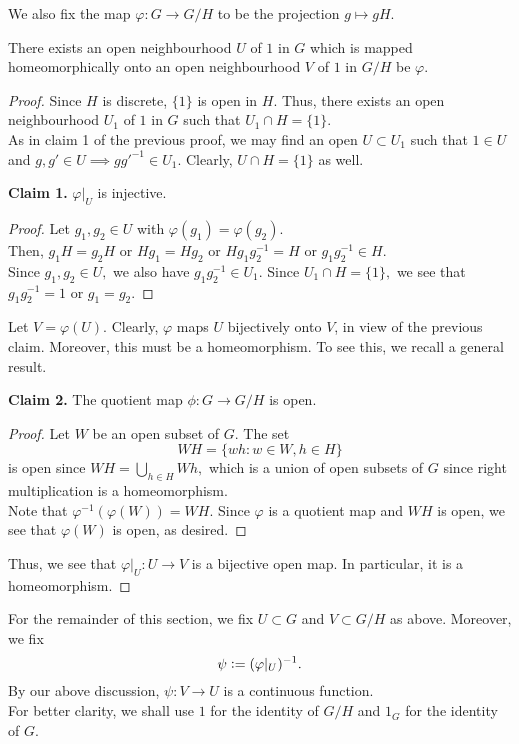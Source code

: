\documentclass[12pt]{article}
\newenvironment{blockquote}
{\begin{mdframed}[skipabove=0pt, skipbelow=0pt, innertopmargin=4pt, innerbottommargin=4pt, bottomline=false,topline=false,rightline=false, linewidth=2pt]}
{\end{mdframed}}
\begin{document}
We also fix the map $\varphi:G \to G/H$ to be the projection $g \mapsto gH.$\\
\begin{lem} 
	There exists an open neighbourhood $U$ of $1$ in $G$ which is mapped homeomorphically onto an open neighbourhood $V$ of $1$ in $G/H$ be $\varphi.$
\end{lem}
\begin{proof} 
	Since $H$ is discrete, $\{1\}$ is open in $H.$ Thus, there exists an open neighbourhood $U_1$ of $1$ in $G$ such that $U_1 \cap H = \{1\}.$\\
	As in claim 1 of the previous proof, we may find an open $U \subset U_1$ such that $1 \in U$ and $g, g' \in U \implies gg'^{-1} \in U_1.$ Clearly, $U \cap H =\{1\}$ as well. \\
	\begin{blockquote}
		\textbf{Claim 1.} $\varphi|_U$ is injective.
	\begin{proof} 
		Let $g_1, g_2 \in U$ with $\varphi(g_1) = \varphi(g_2).$\\
		Then, $g_1H = g_2H$ or $Hg_1 = Hg_2$ or $Hg_1g_2^{-1} = H$ or $g_1g_2^{-1} \in H.$\\
		Since $g_1, g_2 \in U,$ we also have $g_1g_2^{-1} \in U_1.$ Since $U_1 \cap H = \{1\},$ we see that $g_1g_2^{-1} = 1$ or $g_1 = g_2.$
	\end{proof}
	\end{blockquote}
	Let $V = \varphi(U).$ Clearly, $\varphi$ maps $U$ bijectively onto $V$, in view of the previous claim. Moreover, this must be a homeomorphism. To see this, we recall a general result.
	\begin{blockquote}
		\textbf{Claim 2.} The quotient map $\phi:G \to G/H$ is open.
	\begin{proof} 
		Let $W$ be an open subset of $G.$ The set
		\begin{equation*} 
			WH = \{wh : w \in W, h \in H\}
		\end{equation*}
		is open since $WH = \displaystyle\bigcup_{h \in H}Wh,$ which is a union of open subsets of $G$ since right multiplication is a homeomorphism.\\
		Note that $\varphi^{-1}(\varphi(W)) = WH.$ Since $\varphi$ is a quotient map and $WH$ is open, we see that $\varphi(W)$ is open, as desired.
	\end{proof}
	\end{blockquote}
	Thus, we see that $\varphi|_U: U \to V$ is a bijective open map. In particular, it is a homeomorphism.
\end{proof}
For the remainder of this section, we fix $U \subset G$ and $V \subset G/H$ as above. Moreover, we fix
\begin{equation*} 
	\psi \vcentcolon= (\varphi|_U)^{-1}.
\end{equation*}
By our above discussion, $\psi:V \to U$ is a continuous function.\\
For better clarity, we shall use $1$ for the identity of $G/H$ and $1_G$ for the identity of $G.$ 
\end{document}
